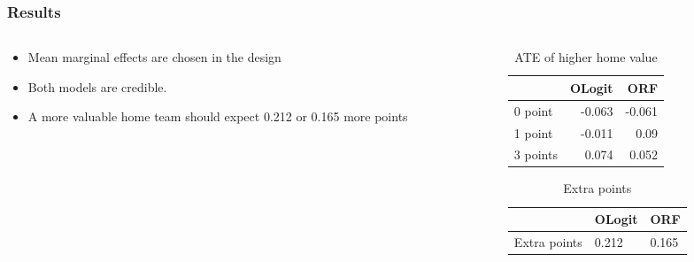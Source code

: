 \documentclass{beamer}
\begin{document}
\begin{frame}
\frametitle{Results}


\begin{columns}
  \begin{column}{.50\textwidth}
   \begin{itemize}
   \setlength\itemsep{1em}
   \item Mean marginal effects are chosen in the design
   \item Both models are credible. 
   \item A more valuable home team should expect 0.212 or 0.165 more points
   \end{itemize}
   \end{column}


\begin{column}{0.50 \textwidth}
\begin{table}[ht]
\centering
	\begin{tabular}{lrr}
	\toprule
	{} &   OLogit &   ORF  \\
	\midrule
	0 point & -0.063 & -0.061\\
	1 point    & -0.011 & 0.09\\
	3 points & 0.074 & 0.052\\
	\bottomrule
	\end{tabular}
	\caption{ATE of higher home value}
	\label{tab:MeanMarg}
\end{table}

\begin{table}[ht]
\centering
	\begin{tabular}{lll}
	\toprule
	{}   & OLogit & ORF \\
	\midrule
	Extra points &  0.212 &  0.165 \\
	\bottomrule
	\end{tabular}
	\caption{Extra points}
	\label{tab:numpoints}
\end{table}
\end{column}
\end{columns}

\end{frame}

\end{document}
